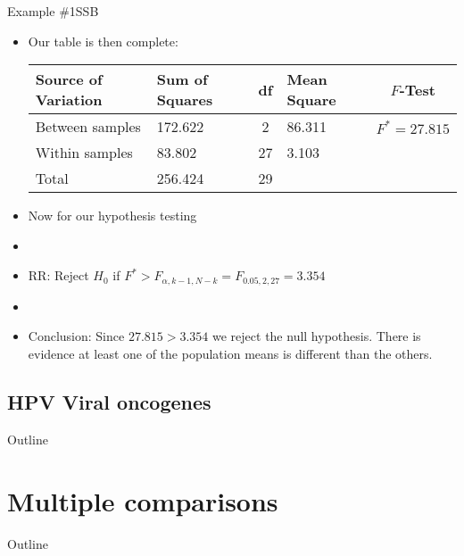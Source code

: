 \documentclass[xcolor=dvipsnames]{beamer}
\begin{document}
\begin{frame}{Example \#1}{SSB}
	\begin{itemize}
		\item Our table is then complete:
		\vspace{2mm}
		\begin{center}
			{\scriptsize
				\begin{tabular}{lp{1.2cm}cp{2.5cm}c}
					\hline 
					\textbf{Source of Variation} & \textbf{Sum of Squares} & \textbf{df} & \textbf{Mean Square} & $F$-\textbf{Test} \\ \hline 
					Between samples & 172.622 & 2 & 86.311 & $F^*=27.815$ \\
					Within samples & 83.802 & 27 &  3.103 & \\
					Total & 256.424 & 29 & & \\ \hline
			\end{tabular}}
		\end{center}
	\vspace{2mm}
	\item Now for our hypothesis testing
	\item[]
	\item RR: Reject $H_0$ if $F^* > F_{\alpha, k-1, N-k} = F_{0.05, 2, 27} =3.354 $
	\item[]
	\item Conclusion: Since $27.815 > 3.354$ we reject the null hypothesis. There is evidence at least one of the population means is different than the others. 
	\end{itemize}
\end{frame}

\subsection{HPV Viral oncogenes}

\begin{frame}{Outline}
\tableofcontents[currentsection,subsectionstyle=show/shaded/hide]
\end{frame}

\section{Multiple comparisons}

\begin{frame}{Outline}
\tableofcontents[currentsection,subsectionstyle=show/shaded/hide]
\end{frame}
\end{document}
